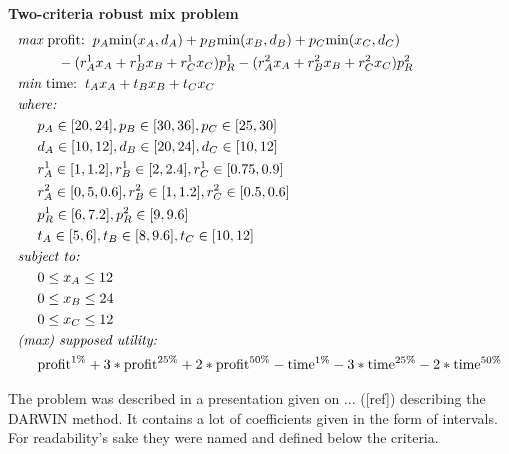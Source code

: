 \begin{description}
  \item{\textbf{Two-criteria robust mix problem}}
    \begin{align*}
      & \textit{max}\text{ profit:} \hspace{0.2cm} p_A \text{min}(x_A, d_A)
      + p_B \text{min}(x_B, d_B) +  p_C \text{min}(x_C, d_C) \\
      & \hspace{1cm} - (r^1_Ax_A + r^1_Bx_B + r^1_Cx_C) p^1_R
      - (r^2_Ax_A + r^2_Bx_B + r^2_Cx_C) p^2_R\\
      & \textit{min}\text{ time:} \hspace{0.2cm} t_Ax_A + t_Bx_B + t_Cx_C \\
      & \textit{where:} \\
      & \hspace{0.5cm} p_A \in [20, 24], p_B \in [30, 36], p_C \in [25, 30] \\
      & \hspace{0.5cm} d_A \in [10, 12], d_B \in [20, 24], d_C \in [10, 12] \\
      & \hspace{0.5cm} r^1_A \in [1, 1.2], r^1_B \in [2, 2.4], r^1_C \in [0.75, 0.9] \\ 
      & \hspace{0.5cm} r^2_A \in [0,5, 0.6], r^2_B \in [1, 1.2], r^2_C \in [0.5, 0.6] \\ 
      & \hspace{0.5cm} p^1_R \in [6, 7.2], p^2_R \in [9, 9.6] \\
      & \hspace{0.5cm} t_A \in [5, 6], t_B \in [8, 9.6], t_C \in [10, 12] \\ 
      & \textit{subject to:} \\
      & \hspace{0.5cm} 0 \le x_A \le 12 \\
      & \hspace{0.5cm} 0 \le x_B \le 24 \\
      & \hspace{0.5cm} 0 \le x_C \le 12 \\
      & \textit{(max) supposed utility:} \\
      & \hspace{0.5cm} \text{profit}^{1\%} + 3 * \text{profit}^{25\%}
      + 2 * \text{profit}^{50\%} - \text{time}^{1\%}
      - 3 * \text{time}^{25\%} - 2 * \text{time}^{50\%} 
    \end{align*}
    
    
    The problem was described in a presentation given on ... ([ref])
    describing the DARWIN method. It contains a lot of coefficients given in
    the form of intervals. For readability's sake they were named and defined
    below the criteria.


\end{description}
